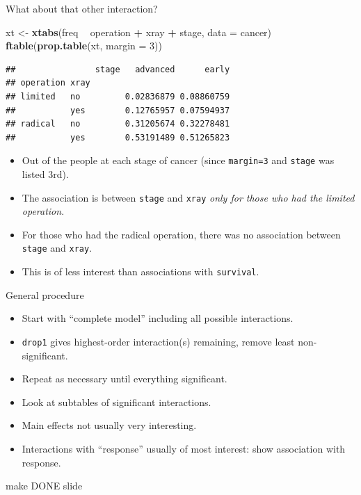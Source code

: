 \documentclass[ignorenonframetext,]{beamer}
\newenvironment{Shaded}{\begin{snugshade}}{\end{snugshade}}
\newcommand{\DataTypeTok}[1]{\textcolor[rgb]{0.13,0.29,0.53}{#1}}
\newcommand{\DecValTok}[1]{\textcolor[rgb]{0.00,0.00,0.81}{#1}}
\newcommand{\KeywordTok}[1]{\textcolor[rgb]{0.13,0.29,0.53}{\textbf{#1}}}
\newcommand{\NormalTok}[1]{#1}
\newcommand{\OperatorTok}[1]{\textcolor[rgb]{0.81,0.36,0.00}{\textbf{#1}}}
\newcommand{\StringTok}[1]{\textcolor[rgb]{0.31,0.60,0.02}{#1}}
\begin{document}
\begin{frame}[fragile]{What about that other interaction?}
\protect\hypertarget{what-about-that-other-interaction}{}

\begin{Shaded}
\begin{Highlighting}[]
\NormalTok{xt <-}\StringTok{ }\KeywordTok{xtabs}\NormalTok{(freq }\OperatorTok{~}\StringTok{ }\NormalTok{operation }\OperatorTok{+}\StringTok{ }\NormalTok{xray }\OperatorTok{+}\StringTok{ }\NormalTok{stage, }\DataTypeTok{data =}\NormalTok{ cancer)}
\KeywordTok{ftable}\NormalTok{(}\KeywordTok{prop.table}\NormalTok{(xt, }\DataTypeTok{margin =} \DecValTok{3}\NormalTok{))}
\end{Highlighting}
\end{Shaded}

\begin{verbatim}
##                stage   advanced      early
## operation xray                            
## limited   no         0.02836879 0.08860759
##           yes        0.12765957 0.07594937
## radical   no         0.31205674 0.32278481
##           yes        0.53191489 0.51265823
\end{verbatim}

\begin{itemize}
\item
  Out of the people at each stage of cancer (since \texttt{margin=3} and
  \texttt{stage} was listed 3rd).
\item
  The association is between \texttt{stage} and \texttt{xray} \emph{only
  for those who had the limited operation}.
\item
  For those who had the radical operation, there was no association
  between \texttt{stage} and \texttt{xray}.
\item
  This is of less interest than associations with \texttt{survival}.
\end{itemize}

\end{frame}

\begin{frame}[fragile]{General procedure}
\protect\hypertarget{general-procedure}{}

\begin{itemize}
\item
  Start with ``complete model'' including all possible interactions.
\item
  \texttt{drop1} gives highest-order interaction(s) remaining, remove
  least non-significant.
\item
  Repeat as necessary until everything significant.
\item
  Look at subtables of significant interactions.
\item
  Main effects not usually very interesting.
\item
  Interactions with ``response'' usually of most interest: show
  association with response.
\end{itemize}

make DONE slide

\end{frame}
\end{document}
